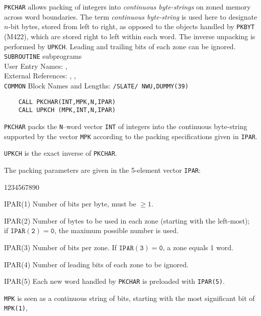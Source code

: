                       
                       
\Submitter{}                           
        
{\tt PKCHAR} allows packing of integers into
{\it continuous byte-strings} on zoned memory across word boundaries.
The term {\it continuous byte-string} is used here to designate
$n$-bit bytes, stored from left to right,
as opposed to the objects handled by {\tt PKBYT} (M422),
which are stored right to left within each word.
The inverse unpacking is performed by {\tt UPKCH}.
Leading and trailing bits of each zone can be ignored.
\Structure
{\tt SUBROUTINE} subprograms\\
User Entry Names: , \\
External References: , , \\
{\tt COMMON} Block Names and Lengths: {\tt /SLATE/ NWU,DUMMY(39)}
\Usage
\begin{verbatim}
    CALL PKCHAR(INT,MPK,N,IPAR)
    CALL UPKCH (MPK,INT,N,IPAR)
\end{verbatim}
{\tt PKCHAR} packs the {\tt N}--word vector {\tt INT} of integers into
the continuous byte-string supported by the vector {\tt MPK} according
to the packing specifications given in {\tt IPAR}.
\par
{\tt UPKCH} is the exact inverse of {\tt PKCHAR}.
\par
The packing parameters are given in the 5-element vector {\tt IPAR}:
\begin{DLtt}{1234567890}
\item [IPAR(1)] Number of bits per byte, must be $\geq 1$.
\item [IPAR(2)] Number of bytes to be used in each
zone (starting with the left-most); \\
if $\mathtt{IPAR(2)=0}$, the maximum
possible number is used.
\item [IPAR(3)] Number of bits per zone. If
$\mathtt{IPAR(3)=0}$, a zone equals 1 word.
\item [IPAR(4)] Number of leading bits of each zone
to be ignored.
\item [IPAR(5)] Each new word handled by {\tt PKCHAR} is preloaded with
{\tt IPAR(5)}.
\end{DLtt}
{\tt MPK} is seen as a continuous string of bits,
starting with the most significant bit of {\tt MPK(1)},
